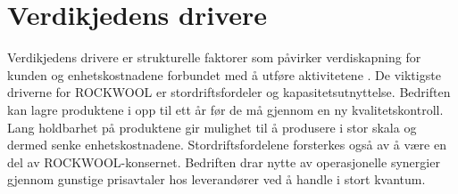 \section{Verdikjedens drivere}
Verdikjedens drivere er strukturelle faktorer som påvirker verdiskapning for kunden og enhetskostnadene forbundet med å utføre aktivitetene \cite[s.~32]{FjeldstadogLunnan2018}. De viktigste driverne for ROCKWOOL er stordriftsfordeler og kapasitetsutnyttelse. Bedriften kan lagre produktene i opp til ett år før de må gjennom en ny kvalitetskontroll. Lang holdbarhet på produktene gir mulighet til å produsere i stor skala og dermed senke enhetskostnadene. Stordriftsfordelene forsterkes også av å være en del av ROCKWOOL-konsernet. Bedriften drar nytte av operasjonelle synergier gjennom gunstige prisavtaler hos leverandører ved å handle i stort kvantum.

